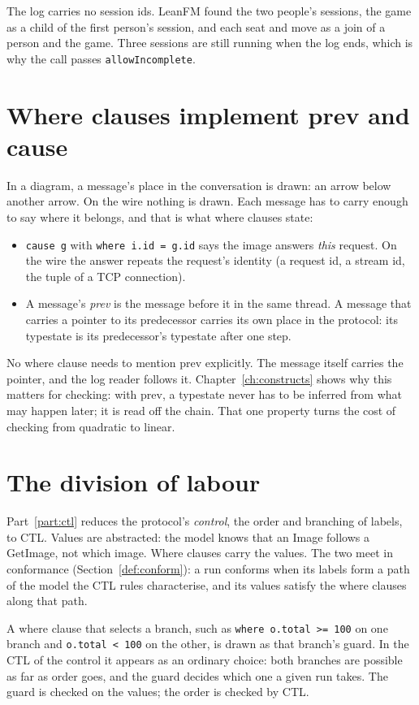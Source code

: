 The log carries no session ids. LeanFM found the two people's sessions, the game as a
child of the first person's session, and each seat and move as a join of a person and
the game. Three sessions are still running when the log ends, which is why the call
passes \texttt{allowIncomplete}.

\section{Where clauses implement prev and cause}

In a diagram, a message's place in the conversation is drawn: an arrow below another
arrow. On the wire nothing is drawn. Each message has to carry enough to say where it
belongs, and that is what where clauses state:

\begin{itemize}
\item \texttt{cause g} with \texttt{where i.id = g.id} says the image answers
  \emph{this} request. On the wire the answer repeats the request's identity
  (a request id, a stream id, the tuple of a TCP connection).
\item A message's \emph{prev} is the message before it in the same thread. A message
  that carries a pointer to its predecessor carries its own place in the protocol: its
  typestate is its predecessor's typestate after one step.
\end{itemize}

No where clause needs to mention prev explicitly. The message itself carries the
pointer, and the log reader follows it. Chapter~\ref{ch:constructs} shows why this
matters for checking: with prev, a typestate never has to be inferred from what may
happen later; it is read off the chain. That one property turns the cost of checking
from quadratic to linear.

\section{The division of labour}

Part~\ref{part:ctl} reduces the protocol's \emph{control}, the order and branching of
labels, to CTL. Values are abstracted: the model knows that an Image follows a
GetImage, not which image. Where clauses carry the values. The two meet in
conformance (Section~\ref{def:conform}): a run conforms when its labels form a path of the model
the CTL rules characterise, and its values satisfy the where clauses along that path.

A where clause that selects a branch, such as \texttt{where o.total >= 100} on one
branch and \texttt{o.total < 100} on the other, is drawn as that branch's guard. In the
CTL of the control it appears as an ordinary choice: both branches are possible as far
as order goes, and the guard decides which one a given run takes. The guard is checked
on the values; the order is checked by CTL.
